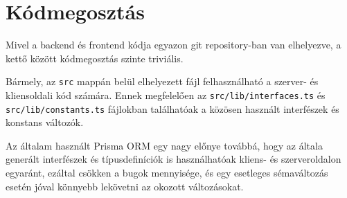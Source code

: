 \section{Kódmegosztás}
Mivel a backend és frontend kódja egyazon git repository-ban van elhelyezve, a kettő között kódmegosztás szinte triviális.

Bármely, az \lstinline|src| mappán belül elhelyezett fájl felhasználható a szerver- és kliensoldali kód számára. Ennek megfelelően
az \lstinline|src/lib/interfaces.ts| és \lstinline|src/lib/constants.ts| fájlokban találhatóak a közösen használt interfészek és konstans változók.

Az általam használt Prisma ORM egy nagy előnye továbbá, hogy az általa generált interfészek és típusdefiníciók is használhatóak kliens- és szerveroldalon
egyaránt, ezáltal csökken a bugok mennyisége, és egy esetleges sémaváltozás esetén jóval könnyebb lekövetni az okozott változásokat.
